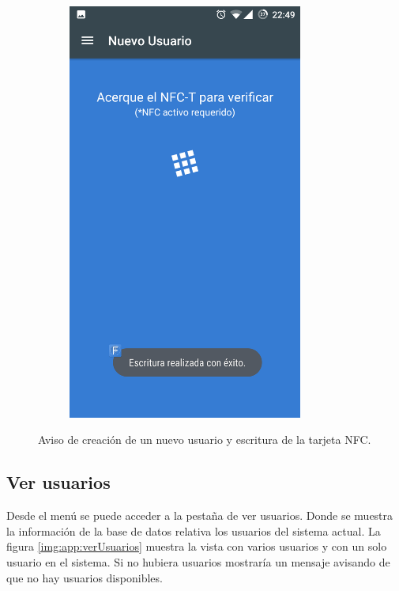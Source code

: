 \documentclass[../PFC.tex]{subfiles}
\begin{document}
\begin{figure}[H]
\begin{subfigure}{0.4\textwidth}
       \includegraphics[width=0.85\textwidth]{./img/app/nuevoUsuarioAgregado}
    \end{subfigure}   
  \caption{Aviso de creación de un nuevo usuario y escritura de la tarjeta NFC.}
  \label{img:app:nuevoUsuario2}
\end{figure}

\subsection{Ver usuarios}
\label{App:AD:Ver usuarios}

Desde el menú se puede acceder a la pestaña de ver usuarios. Donde se muestra la información de la base de datos relativa  los usuarios del sistema actual. La figura \ref{img:app:verUsuarios} muestra la vista con varios usuarios y con un solo usuario en el sistema. Si no hubiera usuarios mostraría un mensaje avisando de que no hay usuarios disponibles.
\end{document}
